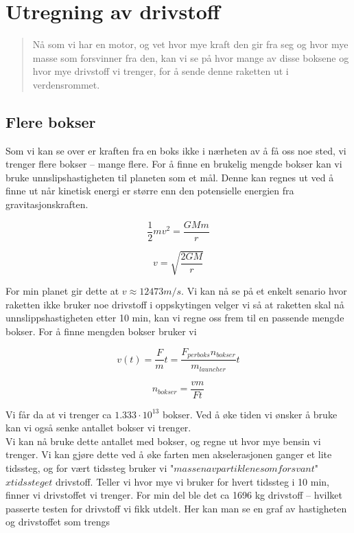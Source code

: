 \documentclass[a4paper,norsk,11pt,twoside]{article}
\begin{document}
\section{Utregning av drivstoff}

\begin{abstract}
Nå som vi har en motor, og vet hvor mye kraft den gir fra seg og hvor mye masse som forsvinner fra den, kan vi se på hvor mange av disse boksene og hvor mye drivstoff vi trenger, for å sende denne raketten ut i verdensrommet.
\end{abstract}

\subsection{Flere bokser}
Som vi kan se over er kraften fra en boks ikke i nærheten av å få oss noe sted, vi trenger flere bokser -- mange flere. For å finne en brukelig mengde bokser kan vi bruke unnslipshastigheten til planeten som et mål. Denne kan regnes ut ved å finne ut når kinetisk energi er større enn den potensielle energien fra gravitasjonskraften.

\begin{equation}
\frac{1}{2}m v^{2} = \frac{GMm}{r}
\end{equation}

\begin{equation}
v = \sqrt{\frac{2GM}{r}}
\end{equation}

For min planet gir dette at $v \approx 12473 m/s$. Vi kan nå se på et enkelt senario hvor raketten ikke bruker noe drivstoff i oppskytingen velger vi så at raketten skal nå unnslippshastigheten etter 10 min, kan vi regne oss frem til en passende mengde bokser. For å finne mengden bokser bruker vi

\begin{equation}
v(t) = \frac{F}{m} t = \frac{F_{per boks}n_{bokser}}{m_{launcher}} t
\end{equation}

\begin{equation}
n_{bokser} = \frac{v m}{F t}
\end{equation}

Vi får da at vi trenger ca $1.333\cdot 10^{13}$ bokser. Ved å øke tiden vi ønsker å bruke kan vi også senke antallet bokser vi trenger.\\

Vi kan nå bruke dette antallet med bokser, og regne ut hvor mye bensin vi trenger. Vi kan gjøre dette ved å øke farten men akselerasjonen ganger et lite tidssteg, og for vært tidssteg bruker vi "$massen av partiklene som forsvant$" $x tidssteget$ drivstoff. Teller vi hvor mye vi bruker for hvert tidssteg i 10 min, finner vi drivstoffet vi trenger. For min del ble det ca 1696 kg drivstoff -- hvilket passerte testen for drivstoff vi fikk utdelt. Her kan man se en graf av hastigheten og drivstoffet som trengs
\end{document}
